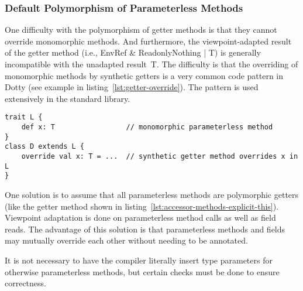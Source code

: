 \subsubsection{Default Polymorphism of Parameterless Methods}

One difficulty with the polymorphism of getter methods is that they cannot override monomorphic methods. And furthermore, the viewpoint-adapted result of the getter method (i.e., {\cd EnvRef \& ReadonlyNothing | T}) is generally incompatible with the unadapted result~{\cd T}. The difficulty is that the overriding of monomorphic methods by synthetic getters is a very common code pattern in Dotty (see example in listing~\ref{lst:getter-override}). The pattern is used extensively in the standard library.

\begin{lstlisting}[float=htbp, caption={Getter Override}, label={lst:getter-override}]
trait L {
	def x: T                 // monomorphic parameterless method
}
class D extends L {
	override val x: T = ...  // synthetic getter method overrides x in L
}
\end{lstlisting}

One solution is to assume that all parameterless methods are polymorphic getters (like the getter method shown in listing~\ref{lst:accessor-methods-explicit-this}). Viewpoint adaptation is done on parameterless method calls as well as field reads. The advantage of this solution is that parameterless methods and fields may mutually override each other without needing to be annotated.

It is not necessary to have the compiler literally insert type parameters for otherwise parameterless methods, but certain checks must be done to ensure correctness.


